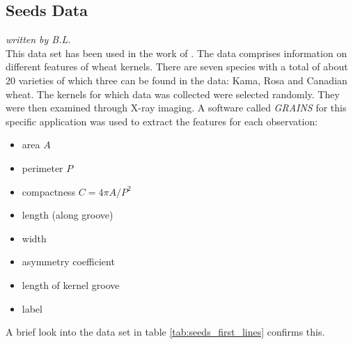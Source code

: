 \subsection{Seeds Data}
\textit{written by B.L.}\\

This data set has been used in the work of \cite{charytanowicz2010complete}. The data comprises information on different features of wheat kernels. There are seven species with a total of about 20 varieties of which three can be found in the data: Kama, Rosa and Canadian wheat. The kernels for which data was collected were selected randomly. They were then examined through X-ray imaging. A software called \textit{GRAINS} for this specific application \cite{strumillo1999computer} was used to extract the features for each observation:

\begin{multicols}{2}
\begin{itemize}
\item area $A$
\item perimeter $P$
\item compactness $C = 4 \pi A/P^{2}$
\item length (along groove)
\item width
\item asymmetry coefficient
\item length of kernel groove
\item label
\end{itemize}
\end{multicols}

A brief look into the data set in table \ref{tab:seeds_first_lines} confirms this.

\begin{table}[H]
\begin{center}
\end{center}
\caption{Seeds Data Set First Observations}
\label{tab:seeds_first_lines}
\end{table}

